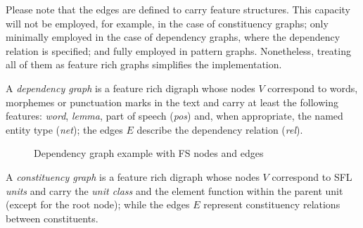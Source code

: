 Please note that the edges are defined to carry feature structures. This capacity will not be employed, for example, in the case of constituency graphs; only minimally employed in the case of dependency graphs, where the dependency relation is specified; and fully employed in pattern graphs. Nonetheless, treating all of them as feature rich graphs simplifies the implementation.

\begin{definition}\label{def:dep-graph}
	A \textit{dependency graph} is a feature rich digraph whose nodes $V$ correspond to words, morphemes or punctuation marks in the text and carry at least the following features: \textit{word}, \textit{lemma}, part of speech (\textit{pos}) and, when appropriate, the named entity type (\textit{net}); the edges $E$ describe the dependency relation (\textit{rel}).
\end{definition}

\begin{figure}[!ht]
\centering
{}
\caption{Dependency graph example with FS nodes and edges}
\label{fig:dep-graph}
\end{figure}


\begin{definition}\label{def:constituency-graph}
	A \textit{constituency graph} is a feature rich digraph whose nodes $V$ correspond to SFL \textit{units} and carry the \textit{unit class} and the element function within the parent unit (except for the root node); while the edges $E$ represent constituency relations between constituents. 
\end{definition}

